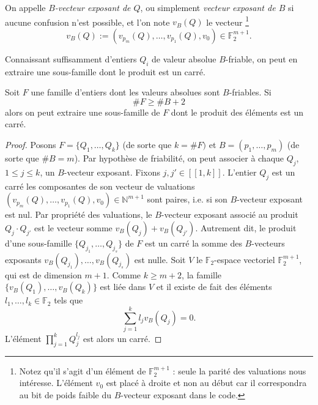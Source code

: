 \begin{definition}
	On appelle \emph{$B$-vecteur exposant de $Q$}, ou simplement \emph{vecteur
	exposant de $B$} si aucune confusion n'est possible, et l'on note $v_B(Q)$
	le vecteur \footnote{Notez qu'il s'agit d'un élément de
	$\mathbb{F}_2^{m+1}$ : seule la parité des valuations nous intéresse.
	L'élément $v_0$ est placé à droite et non au début car il correspondra au
	bit de poids faible du $B$-vecteur exposant dans le code.} \[v_B(Q) :=
	(v_{p_m}(Q), \dots, v_{p_1}(Q), v_0 ) \in \mathbb{F}_2^{m+1}.\] 
\end{definition}

Connaissant suffisamment d'entiers $Q_i$ de valeur absolue $B$-friable, on peut
en extraire une sous-famille dont le produit est un carré.

\begin{proposition}
	Soit $F$ une famille d'entiers dont les valeurs absolues sont $B$-friables.
	Si \[\# F \geqslant \# B + 2\] alors on peut extraire une sous-famille de
	$F$ dont le produit des éléments est un carré.
\end{proposition}

\begin{proof}
	Posons $F = \{Q_1, \dots, Q_k\}$ (de sorte que $k = \# F)$ et $B = (p_1,
	\dots, p_m)$ (de sorte que $\# B = m$). Par hypothèse de friabilité, on
	peut associer à chaque $Q_j$, $1\leqslant j \leqslant k$, un $B$-vecteur
	exposant. Fixons $j, j'\in [\![1,k]\!]$. L'entier $Q_j$ est un carré \ssi
	les composantes de son vecteur de valuations $(v_{p_m}(Q), \dots,
	v_{p_1}(Q), v_0 ) \in \mathbb{N}^{m+1}$ sont paires, i.e. si son
	$B$-vecteur exposant est nul. Par propriété des valuations, le $B$-vecteur
	exposant associé au produit $Q_j\cdot Q_{j'}$ est le vecteur somme
	$v_B(Q_j) + v_B(Q_{j'})$. Autrement dit, le produit d'une sous-famille
	$\{Q_{j_1}, \dots, Q_{j_s}\}$ de $F$ est un carré \ssi la somme des
	$B$-vecteurs exposants $v_B(Q_{j_1}), \dots, v_B(Q_{j_s})$ est nulle. Soit
	$V$ le $\mathbb{F}_2$-espace vectoriel $\mathbb{F}_2^{m+1}$, qui est de
	dimension $m+1$. Comme $k\geqslant m+2$, la famille $\{v_B(Q_1), \dots,
	v_B(Q_k)\}$ est liée dans $V$ et il existe de fait des éléments $l_1,\dots,
	l_k\in \mathbb{F}_2$ tels que \[\sum_{j=1}^k l_j v_B(Q_j) = 0.\] L'élément
	$\prod_{j=1}^k Q_j^{l_j}$ est alors un carré.
\end{proof}

